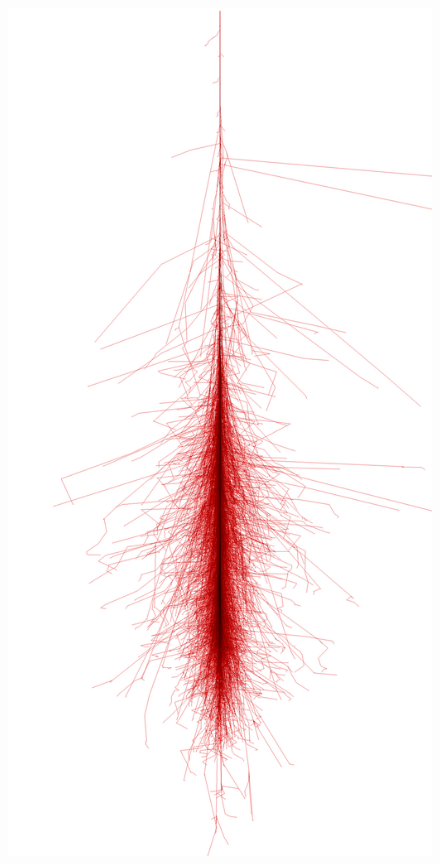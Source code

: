 \documentclass[aspectratio=1610, professionalfonts, 9pt]{beamer}
\begin{document}
\begin{frame}
  \begin{columns}[onlytextwidth]
	\begin{figure}
	  \centering
	  \includegraphics[width=\textwidth]{./images/photon_100GeV.png}

\end{figure}
\end{columns}
\end{frame}
\end{document}
